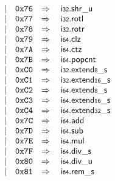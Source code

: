 $$\begin{array}[t]{@{}lrrl@{}l@{}l@{}l@{}}
& & | & \mathtt{0x76} & \quad\Rightarrow\quad{} & \mathsf{i{\scriptstyle 32}} {.} {\mathsf{shr}}{\mathsf{\_}}{\mathsf{u}} \\
& & | & \mathtt{0x77} & \quad\Rightarrow\quad{} & \mathsf{i{\scriptstyle 32}} {.} \mathsf{rotl} \\
& & | & \mathtt{0x78} & \quad\Rightarrow\quad{} & \mathsf{i{\scriptstyle 32}} {.} \mathsf{rotr} \\
& & | & \mathtt{0x79} & \quad\Rightarrow\quad{} & \mathsf{i{\scriptstyle 64}} {.} \mathsf{clz} \\
& & | & \mathtt{0x7A} & \quad\Rightarrow\quad{} & \mathsf{i{\scriptstyle 64}} {.} \mathsf{ctz} \\
& & | & \mathtt{0x7B} & \quad\Rightarrow\quad{} & \mathsf{i{\scriptstyle 64}} {.} \mathsf{popcnt} \\
& & | & \mathtt{0xC0} & \quad\Rightarrow\quad{} & \mathsf{i{\scriptstyle 32}} {.} {\mathsf{extend}}{\mathsf{{\scriptstyle 8}}}{\mathsf{\_}}{\mathsf{s}} \\
& & | & \mathtt{0xC1} & \quad\Rightarrow\quad{} & \mathsf{i{\scriptstyle 32}} {.} {\mathsf{extend}}{\mathsf{{\scriptstyle 16}}}{\mathsf{\_}}{\mathsf{s}} \\
& & | & \mathtt{0xC2} & \quad\Rightarrow\quad{} & \mathsf{i{\scriptstyle 64}} {.} {\mathsf{extend}}{\mathsf{{\scriptstyle 8}}}{\mathsf{\_}}{\mathsf{s}} \\
& & | & \mathtt{0xC3} & \quad\Rightarrow\quad{} & \mathsf{i{\scriptstyle 64}} {.} {\mathsf{extend}}{\mathsf{{\scriptstyle 16}}}{\mathsf{\_}}{\mathsf{s}} \\
& & | & \mathtt{0xC4} & \quad\Rightarrow\quad{} & \mathsf{i{\scriptstyle 64}} {.} {\mathsf{extend}}{\mathsf{{\scriptstyle 32}}}{\mathsf{\_}}{\mathsf{s}} \\
& & | & \mathtt{0x7C} & \quad\Rightarrow\quad{} & \mathsf{i{\scriptstyle 64}} {.} \mathsf{add} \\
& & | & \mathtt{0x7D} & \quad\Rightarrow\quad{} & \mathsf{i{\scriptstyle 64}} {.} \mathsf{sub} \\
& & | & \mathtt{0x7E} & \quad\Rightarrow\quad{} & \mathsf{i{\scriptstyle 64}} {.} \mathsf{mul} \\
& & | & \mathtt{0x7F} & \quad\Rightarrow\quad{} & \mathsf{i{\scriptstyle 64}} {.} {\mathsf{div}}{\mathsf{\_}}{\mathsf{s}} \\
& & | & \mathtt{0x80} & \quad\Rightarrow\quad{} & \mathsf{i{\scriptstyle 64}} {.} {\mathsf{div}}{\mathsf{\_}}{\mathsf{u}} \\
& & | & \mathtt{0x81} & \quad\Rightarrow\quad{} & \mathsf{i{\scriptstyle 64}} {.} {\mathsf{rem}}{\mathsf{\_}}{\mathsf{s}} \\

\end{array}$$
